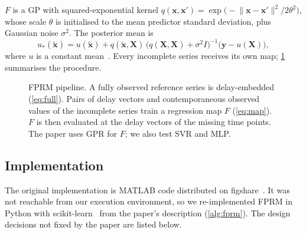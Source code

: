 \documentclass[11pt,a4paper]{article}
\begin{document}
$F$ is a GP with squared-exponential kernel $q(\mathbf{x},\mathbf{x}') = \exp\!\big(-\lVert\mathbf{x}-\mathbf{x}'\rVert^2/2\theta^2\big)$, whose scale $\theta$ is initialised to the mean predictor standard deviation, plus Gaussian noise $\sigma^2$.
The posterior mean is
\begin{equation}
  u_*(\tilde{\mathbf{x}}) = u(\tilde{\mathbf{x}}) + q(\tilde{\mathbf{x}},\mathbf{X})\,\big(q(\mathbf{X},\mathbf{X})+\sigma^2 I\big)^{-1}\big(\mathbf{y}-u(\mathbf{X})\big),
  \label{eq:gp}
\end{equation}
where $u$ is a constant mean~\cite[Eqs.~15--18]{wu2026fprm}.
Every incomplete series receives its own map; \cref{fig:pipeline} summarises the procedure.

\begin{figure}[t]
  \centering
  \newcommand{\PLa}{\textbf{complete series} $x_i$}
  \newcommand{\PLb}{\textbf{incomplete series} $x_j$}
  \newcommand{\PLc}{\textbf{full reconstruction}}
  \newcommand{\PLd}{\textbf{training pairs}}
  \newcommand{\PLe}{\textbf{learn mapping} $F$}
  \newcommand{\PLf}{\textbf{impute}}
  \newcommand{\PLg}{delay embed}
  \newcommand{\PLh}{missing $k$}
  \resizebox{\linewidth}{!}{}
  \caption{FPRM pipeline. A fully observed reference series is delay-embedded (\cref{eq:full}). Pairs of delay vectors and contemporaneous observed values of the incomplete series train a regression map $F$ (\cref{eq:map}). $F$ is then evaluated at the delay vectors of the missing time points. The paper uses GPR for $F$; we also test SVR and MLP.}
  \label{fig:pipeline}
\end{figure}

\subsection{Implementation}\label{sec:impl}

The original implementation is MATLAB code distributed on figshare~\cite{wu2026fprm}.
It was not reachable from our execution environment, so we re-implemented FPRM in Python with scikit-learn~\cite{pedregosa2011} from the paper's description (\cref{alg:fprm}).
The design decisions not fixed by the paper are listed below.
\end{document}
